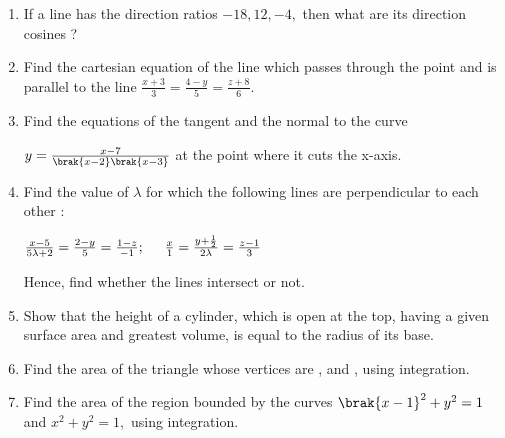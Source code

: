 
\begin{enumerate}
\item If a line has the direction ratios $-18, 12, -4,$ then what are its direction cosines ?
      
    \item Find the cartesian equation of the line which passes through the point  and is parallel to the line 
    $\frac{x+3}{3}=\frac{4-y}{5}=\frac{z+8}{6}.$
    \item Find the equations of the tangent and the normal to the curve 

     $y=\frac{x-7}{\brak{x-2}\brak{x-3}}$ at the point where it cuts the x-axis.
    \item Find the value of  $\lambda$ for which the following lines are perpendicular to each other :

     \hspace{2cm} $\frac{x-5}{5\lambda + 2} = \frac{2-y}{5} = \frac{1-z}{-1};\hspace{0.5cm} \frac{x}{1} = \frac{y+\frac{1}{2}}{2\lambda} = \frac{z-1}{3}$

     Hence, find whether the lines intersect or not.
    \item Show that the height of a cylinder, which is open at the top, having a given surface area and greatest volume, is equal to the radius of its base.

    \item  Find the area of the triangle whose vertices are ,  and ,  using integration.

    \item Find the area of the region bounded by the curves $\brak{x - 1}  ^2 + y^2 = 1$ and $x^2 + y^2 =1 , $ using integration.

 \end{enumerate}
 

